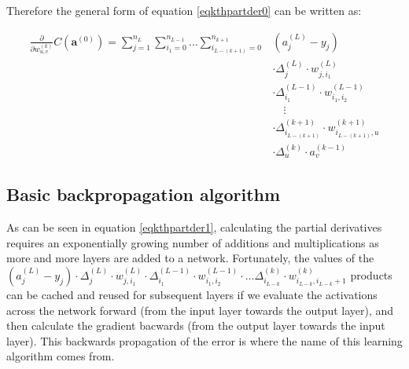 \documentclass[titlepage]{article}
\begin{document}
          Therefore the general form of equation \ref{eqkthpartder0} can be
          written as:

          \begin{equation}\label{eqkthpartder1}
            \begin{split}
              \frac{\partial}{\partial w_{u,v}^{(k)}}
                C \left( \mathbf{a}^{(0)} \right)
                    = \sum_{j=1}^{n_L}
                        \sum_{i_1=0}^{n_{L-1}}
                          \ldots
                          \sum_{i_{L-(k+1)}=0}^{n_{k+1}}
                            & \left( a_j^{(L)} - y_j \right) \\
                            & \cdot
                              \Delta_j^{(L)}
                              \cdot
                              w_{j,i_1}^{(L)} \\
                            & \cdot
                              \Delta_{i_1}^{(L-1)}
                              \cdot
                              w_{i_1,i_2}^{(L-1)} \\
                            & \quad \vdots \\
                            & \cdot
                              \Delta_{i_{L-(k+1)}}^{(k+1)}
                              \cdot
                              w_{i_{L-(k+1)},u}^{(k+1)} \\
                            & \cdot
                              \Delta_u^{(k)}
                              \cdot
                              a_v^{(k-1)}
            \end{split}
          \end{equation}

\newpage

    \subsection{Basic backpropagation algorithm}

      As can be seen in equation \ref{eqkthpartder1}, calculating the partial
      derivatives requires an exponentially growing number of additions and
      multiplications as more and more layers are added to a network.
      Fortunately, the values of the
      $
        \left( a_j^{(L)} - y_j \right)
        \cdot
        \Delta_j^{(L)}
        \cdot
        w_{j,i_1}^{(L)}
        \cdot
        \Delta_{i_1}^{(L-1)}
        \cdot
        w_{i_1,i_2}^{(L-1)}
        \cdot
        \ldots
        \Delta_{i_{L-k}}^{(k)}
        \cdot
        w_{i_{L-k},i_{L-k}+1}^{(k)}
      $ products can be cached and reused for subsequent layers if we evaluate
      the activations across the network forward (from the input layer towards
      the output layer), and then calculate the gradient bacwards (from the
      output layer towards the input layer). This backwards propagation of the
      error is where the name of this learning algorithm comes from.
\end{document}
